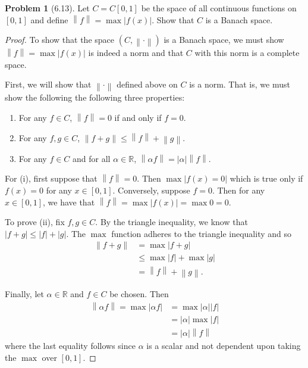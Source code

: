 \documentclass[12pt]{article}
\newcommand{\R}{\mathbb{R}}
\newcommand{\abs}[1]{
    \left\lvert #1 \right\rvert
}
\newcommand{\norm}[1]{
    \left\lVert #1 \right\rVert
}
\theoremstyle{definition}
\newtheorem{problem}{Problem}
\begin{document}
\begin{problem}[6.13]

    Let \( C = C[0,1] \) be the space of all continuous functions on \( [0,1 ] \) and define \( \norm{f} = \max |f(x)| \).
    Show that \( C \) is a Banach space. 

        \begin{proof}
            To show that the space \( (C, \norm{\cdot})\) is a Banach space, we must show \( \norm{f} = \max |f(x)| \) is indeed a norm and that \( C \) with this norm is a complete space. 
            
            First, we will show that \( \norm{\cdot} \) defined above on \( C \) is a norm. 
            That is, we must show the following the following three properties:
                \begin{enumerate}[label = (\roman{*})]
                    \item For any \( f \in C \), \( \norm{f} = 0 \) if and only if \( f = 0 \).
                    \item For any \( f, g \in C \), \( \norm{f + g} \leq \norm{f} + \norm{g} \).
                    \item For any \( f \in C \) and for all \( \alpha \in \R \), \( \norm{\alpha f } = \abs{\alpha} \norm{f} \).
                \end{enumerate}
            For (i), first suppose that \( \norm{f} = 0 \). Then \( \max \abs{f(x) = 0 } \) which is true only if \( f(x) = 0 \) for any \( x \in [0,1] \). 
            Conversely, suppose \( f = 0 \). Then for any \( x \in [0,1] \), we have that \( \norm{f} = \max \abs{f(x)} = \max 0 = 0 \).

            To prove (ii), fix \( f, g \in C \). By the triangle inequality, we know that \( \abs{f + g} \leq \abs{f} + \abs{g} \).
            The \( \max \) function adheres to the triangle inequality and so 
                \begin{align*}
                    \norm{f + g} &= \max \abs{f + g} \\
                    &\leq \max \abs{f} + \max \abs{g} \\
                    &= \norm{f} + \norm{g}.
                \end{align*}
            
            Finally, let \( \alpha \in \R \) and \( f \in C \) be chosen. 
            Then 
                \begin{align*}
                    \norm{\alpha f} = \max \abs{\alpha f} &= \max \abs{\alpha} \abs{f} \\
                    &= \abs{\alpha} \max \abs{f} \\
                    &= \abs{\alpha} \norm{f}
                \end{align*}
            where the last equality follows since \( \alpha \) is a scalar and not dependent upon taking the \( \max \) over \( [0,1] \).


\end{proof}
\end{problem}
\end{document}
